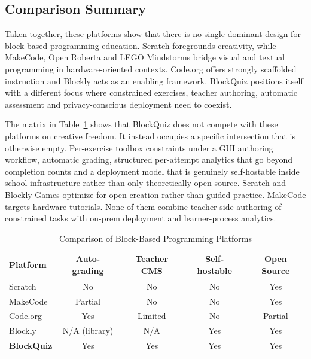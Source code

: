 \subsection{Comparison Summary}
Taken together, these platforms show that there is no single dominant design for block-based programming education. Scratch foregrounds creativity, while MakeCode, Open Roberta and LEGO Mindstorms bridge visual and textual programming
in hardware-oriented contexts. Code.org offers strongly scaffolded instruction and Blockly acts as an enabling framework.
BlockQuiz positions itself with a different focus where constrained exercises, teacher authoring, automatic assessment and privacy-conscious deployment need to coexist.

The matrix in Table~\ref{tab:platform-comparison} shows that BlockQuiz does not compete with these platforms on creative freedom. It instead occupies a specific intersection that is otherwise empty.
Per-exercise toolbox constraints under a GUI authoring workflow, automatic grading, structured per-attempt analytics that go beyond completion counts and a deployment model that is
genuinely self-hostable inside school infrastructure rather than only theoretically open source.
Scratch and Blockly Games optimize for open creation rather than guided practice. MakeCode targets hardware tutorials. None of them combine teacher-side authoring of constrained tasks with on-prem deployment
and learner-process analytics.

\begin{table}[H]
  \centering
  \caption{Comparison of Block-Based Programming Platforms}
  \label{tab:platform-comparison}
  \begin{tabular}{|l|c|c|c|c|}
    \hline
    \textbf{Platform}  & \textbf{Auto-grading} & \textbf{Teacher CMS} & \textbf{Self-hostable} & \textbf{Open Source} \\
    \hline
    Scratch            & No                    & No                   & No                     & Yes                  \\
    MakeCode           & Partial               & No                   & No                     & Yes                  \\
    Code.org           & Yes                   & Limited              & No                     & Partial              \\
    Blockly            & N/A (library)         & N/A                  & Yes                    & Yes                  \\
    \textbf{BlockQuiz} & Yes                   & Yes                  & Yes                    & Yes                  \\
    \hline
  \end{tabular}
\end{table}

